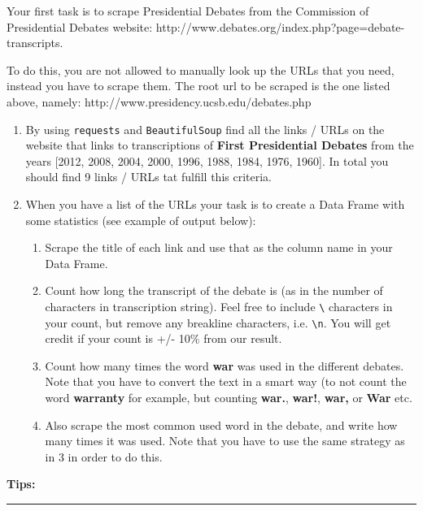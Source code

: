 \documentclass[11pt]{article}
\providecommand{\tightlist}{%
      \setlength{\itemsep}{0pt}\setlength{\parskip}{0pt}}
\begin{document}
Your first task is to scrape Presidential Debates from the Commission of
Presidential Debates website:
http://www.debates.org/index.php?page=debate-transcripts.

To do this, you are not allowed to manually look up the URLs that you
need, instead you have to scrape them. The root url to be scraped is the
one listed above, namely: http://www.presidency.ucsb.edu/debates.php

\begin{enumerate}
\def\labelenumi{\arabic{enumi}.}
\tightlist
\item
  By using \texttt{requests} and \texttt{BeautifulSoup} find all the
  links / URLs on the website that links to transcriptions of
  \textbf{First Presidential Debates} from the years {[}2012, 2008,
  2004, 2000, 1996, 1988, 1984, 1976, 1960{]}. In total you should find
  9 links / URLs tat fulfill this criteria.
\item
  When you have a list of the URLs your task is to create a Data Frame
  with some statistics (see example of output below):

  \begin{enumerate}
  \def\labelenumii{\arabic{enumii}.}
  \tightlist
  \item
    Scrape the title of each link and use that as the column name in
    your Data Frame.
  \item
    Count how long the transcript of the debate is (as in the number of
    characters in transcription string). Feel free to include
    \texttt{\textbackslash{}} characters in your count, but remove any
    breakline characters, i.e. \texttt{\textbackslash{}n}. You will get
    credit if your count is +/- 10\% from our result.
  \item
    Count how many times the word \textbf{war} was used in the different
    debates. Note that you have to convert the text in a smart way (to
    not count the word \textbf{warranty} for example, but counting
    \textbf{war.}, \textbf{war!}, \textbf{war,} or \textbf{War} etc.
  \item
    Also scrape the most common used word in the debate, and write how
    many times it was used. Note that you have to use the same strategy
    as in 3 in order to do this.
  \end{enumerate}
\end{enumerate}

\textbf{Tips:}

\begin{center}\rule{0.5\linewidth}{\linethickness}\end{center}
\end{document}
